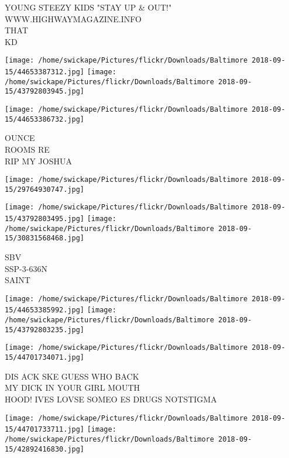 \documentclass[10pt,letterpaper]{article}
\begin{document}
YOUNG STEEZY KIDS "STAY UP \& OUT!"\\
WWW.HIGHWAYMAGAZINE.INFO\\
THAT\\
KD\\
\pagebreak

\texttt{[image: /home/swickape/Pictures/flickr/Downloads/Baltimore 2018-09-15/44653387312.jpg]}
\texttt{[image: /home/swickape/Pictures/flickr/Downloads/Baltimore 2018-09-15/43792803945.jpg]}

\texttt{[image: /home/swickape/Pictures/flickr/Downloads/Baltimore 2018-09-15/44653386732.jpg]}

OUNCE\\
ROOMS RE\\
RIP MY JOSHUA\\
\pagebreak

\texttt{[image: /home/swickape/Pictures/flickr/Downloads/Baltimore 2018-09-15/29764930747.jpg]}

\vspace{0.25in}
\texttt{[image: /home/swickape/Pictures/flickr/Downloads/Baltimore 2018-09-15/43792803495.jpg]}
\texttt{[image: /home/swickape/Pictures/flickr/Downloads/Baltimore 2018-09-15/30831568468.jpg]}

SBV\\
SSP{-}3{-}636N\\
SAINT\\
\pagebreak

\texttt{[image: /home/swickape/Pictures/flickr/Downloads/Baltimore 2018-09-15/44653385992.jpg]}
\texttt{[image: /home/swickape/Pictures/flickr/Downloads/Baltimore 2018-09-15/43792803235.jpg]}

\vspace{0.25in}
\texttt{[image: /home/swickape/Pictures/flickr/Downloads/Baltimore 2018-09-15/44701734071.jpg]}

DIS ACK SKE GUESS WHO BACK\\
MY DICK IN YOUR GIRL MOUTH\\
HOOD!  IVES LOVSE SOMEO ES DRUGS NOTSTIGMA\\
\pagebreak

\texttt{[image: /home/swickape/Pictures/flickr/Downloads/Baltimore 2018-09-15/44701733711.jpg]}
\texttt{[image: /home/swickape/Pictures/flickr/Downloads/Baltimore 2018-09-15/42892416830.jpg]}
\end{document}
